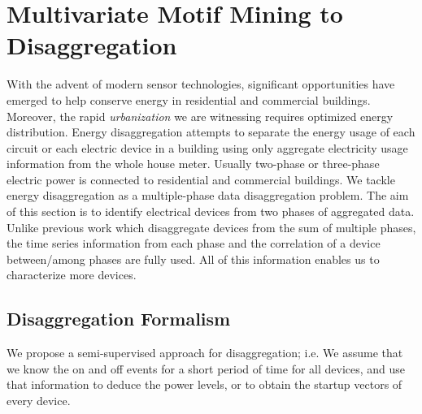 \section{Multivariate Motif Mining to Disaggregation}
With the advent of modern sensor technologies, 
significant opportunities have emerged to help conserve energy in 
residential and commercial buildings. Moreover, the rapid \emph{urbanization} we are witnessing requires optimized energy distribution. 
Energy disaggregation attempts to 
separate the energy usage 
of each circuit or each electric device in a building 
using only aggregate electricity usage information from 
the whole house meter. 
Usually two-phase or three-phase electric power is 
connected to residential and commercial buildings. 
We tackle energy disaggregation as a multiple-phase data disaggregation problem. 
The aim of this section is to identify electrical devices from 
two phases of aggregated data. 
Unlike previous work which disaggregate devices
from the sum of multiple phases, 
the time series information from each phase and the correlation of a device between/among phases 
are fully used.  
All of this information enables us to characterize more devices. 


\subsection{Disaggregation Formalism}
We propose a semi-supervised approach for disaggregation; i.e.
We assume that we know the on and off events for a short period of time for all devices, %
and use that information to deduce the power levels, %
or to obtain the startup vectors of every device.

